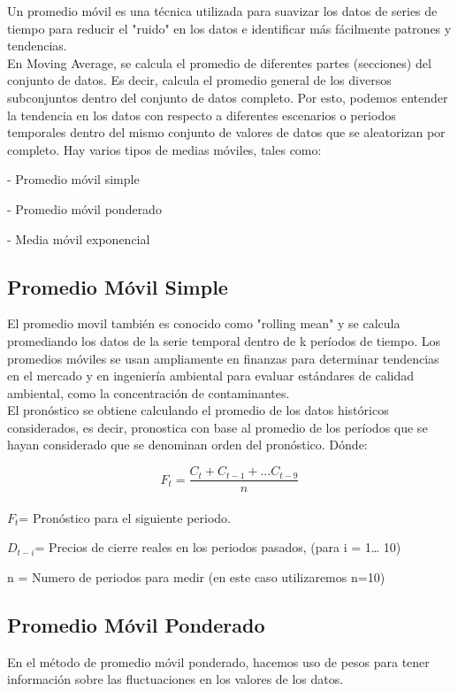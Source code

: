\documentclass[letter, 12pt]{article}
\begin{document}
Un promedio móvil es una técnica utilizada para suavizar los datos de series de tiempo para reducir el "ruido" en los datos e identificar más fácilmente patrones y tendencias.\\

En Moving Average, se calcula el promedio de diferentes partes (secciones) del conjunto de datos. Es decir, calcula el promedio general de los diversos subconjuntos dentro del conjunto de datos completo. Por esto, podemos entender la tendencia en los datos con respecto a diferentes escenarios o periodos temporales dentro del mismo conjunto de valores de datos que se aleatorizan por completo. Hay varios tipos de medias móviles, tales como:

- Promedio móvil simple

- Promedio móvil ponderado

- Media móvil exponencial


\subsection{Promedio Móvil Simple}

El promedio movil también es conocido como "rolling mean" y se calcula promediando los datos de la serie temporal dentro de k períodos de tiempo. Los promedios móviles se usan ampliamente en finanzas para determinar tendencias en el mercado y en ingeniería ambiental para evaluar estándares de calidad ambiental, como la concentración de contaminantes.\\

El pronóstico se obtiene calculando el promedio de los datos históricos considerados, es decir, pronostica con base al promedio de los períodos que se hayan considerado que se denominan orden del pronóstico. Dónde:

$$ F_{t}=\frac{C_{t}+C_{t-1}+...C_{t-9}}{n}$$\\

$F_{t}$= Pronóstico para el siguiente periodo.

$D_{t-i}$= Precios de cierre reales en los periodos pasados, (para i = 1… 10)

n = Numero de periodos para medir (en este caso utilizaremos n=10)

\subsection{Promedio Móvil Ponderado}

En el método de promedio móvil ponderado, hacemos uso de pesos para tener información sobre las fluctuaciones en los valores de los datos.\\
\end{document}
